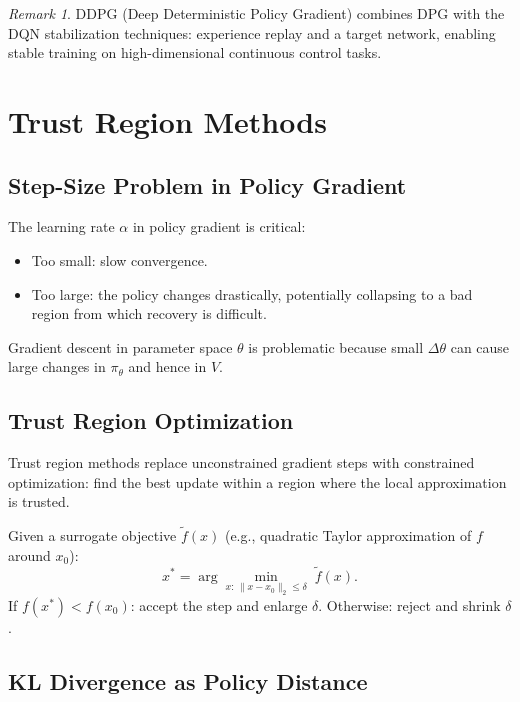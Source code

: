 \documentclass[11pt,a4paper]{article}
\theoremstyle{definition}
\theoremstyle{plain}
\theoremstyle{remark}
\newtheorem*{remark}{Remark}
\begin{document}
\begin{remark}
DDPG (Deep Deterministic Policy Gradient) combines DPG with the DQN stabilization techniques: experience replay and a target network, enabling stable training on high-dimensional continuous control tasks.
\end{remark}

\section{Trust Region Methods}

\subsection{Step-Size Problem in Policy Gradient}

The learning rate $\alpha$ in policy gradient is critical:
\begin{itemize}
    \item Too small: slow convergence.
    \item Too large: the policy changes drastically, potentially collapsing to a bad region from which recovery is difficult.
\end{itemize}
Gradient descent in parameter space $\theta$ is problematic because small $\Delta\theta$ can cause large changes in $\pi_\theta$ and hence in $V$.

\subsection{Trust Region Optimization}

Trust region methods replace unconstrained gradient steps with constrained optimization: find the best update within a region where the local approximation is trusted.

\begin{tcolorbox}[colback=blue!5!white,colframe=blue!75!black,title=\textbf{Trust Region Update}]
Given a surrogate objective $\tilde{f}(x)$ (e.g., quadratic Taylor approximation of $f$ around $x_0$):
\[
    x^* = \arg\min_{x:\, \|x - x_0\|_2 \le \delta}\; \tilde{f}(x).
\]
If $f(x^*) < f(x_0)$: accept the step and enlarge $\delta$. Otherwise: reject and shrink $\delta$.
\end{tcolorbox}

\subsection{KL Divergence as Policy Distance}
\end{document}
